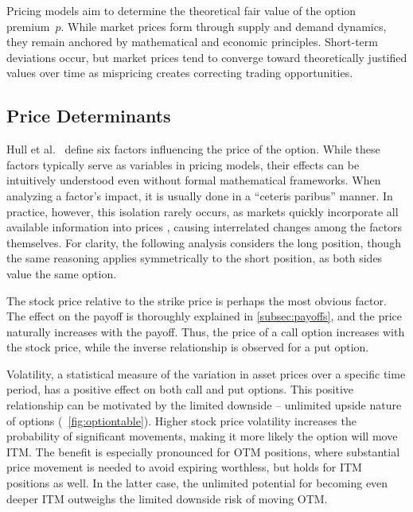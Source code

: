 \documentclass[english,12pt,a4paper,pdftex,sci,utf8]{aaltothesis}
\begin{document}
Pricing models aim to determine the theoretical fair value of the option \mbox{premium $p$.} While market prices form through supply and demand dynamics, they remain anchored by mathematical and economic principles. Short-term deviations occur, but market prices tend to converge toward theoretically justified values over time as mispricing creates correcting trading opportunities.

\clearpage

\subsection{Price Determinants}

Hull et al.\ \cite{hull2013fundamentals} define six factors influencing the price of the option. While these factors typically serve as variables in pricing models, their effects can be intuitively understood even without formal mathematical frameworks. When analyzing a factor's impact, it is usually done in a ``ceteris paribus'' manner. In practice, however, this isolation rarely occurs, as markets quickly incorporate all available information into prices \cite{fama1970efficient}, causing interrelated changes among the factors themselves. For clarity, the following analysis considers the long position, though the same reasoning applies symmetrically to the short position, as both sides value the same option.

The stock price relative to the strike price is perhaps the most obvious factor. The effect on the payoff is thoroughly explained in \cref{subsec:payoffs}, and the price naturally increases with the payoff. Thus, the price of a call option increases with the stock price, while the inverse relationship is observed for a put option.

Volatility, a statistical measure of the variation in asset prices over a specific time period, has a positive effect on both call and put options. This positive relationship can be motivated by the limited downside -- unlimited upside nature of options (~\ref{fig:optiontable}). Higher stock price volatility increases the probability of significant movements, making it more likely the option will move ITM. The benefit is especially pronounced for OTM positions, where substantial price movement is needed to avoid expiring worthless, but holds for ITM positions as well. In the latter case, the unlimited potential for becoming even deeper ITM outweighs the limited downside risk of moving OTM.
\end{document}
